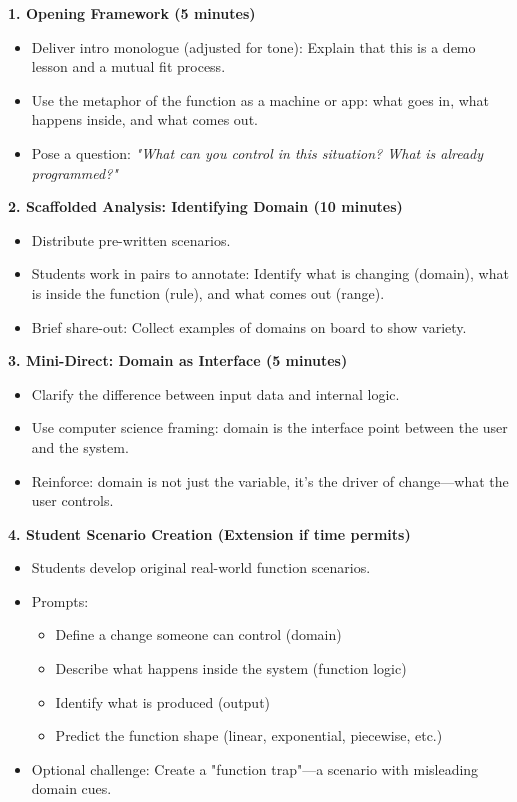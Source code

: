 \documentclass[12pt]{article}
\begin{document}
\textbf{1. Opening Framework (5 minutes)}
\begin{itemize}[nosep]
  \item Deliver intro monologue (adjusted for tone): Explain that this is a demo lesson and a mutual fit process.
  \item Use the metaphor of the function as a machine or app: what goes in, what happens inside, and what comes out.
  \item Pose a question: \textit{"What can you control in this situation? What is already programmed?"}
\end{itemize}

\textbf{2. Scaffolded Analysis: Identifying Domain (10 minutes)}
\begin{itemize}[nosep]
  \item Distribute pre-written scenarios.
  \item Students work in pairs to annotate: Identify what is changing (domain), what is inside the function (rule), and what comes out (range).
  \item Brief share-out: Collect examples of domains on board to show variety.
\end{itemize}

\textbf{3. Mini-Direct: Domain as Interface (5 minutes)}
\begin{itemize}[nosep]
  \item Clarify the difference between input data and internal logic.
  \item Use computer science framing: domain is the interface point between the user and the system.
  \item Reinforce: domain is not just the variable, it's the driver of change—what the user controls.
\end{itemize}

\textbf{4. Student Scenario Creation (Extension if time permits)}
\begin{itemize}[nosep]
  \item Students develop original real-world function scenarios.
  \item Prompts:
    \begin{itemize}[nosep]
      \item Define a change someone can control (domain)
      \item Describe what happens inside the system (function logic)
      \item Identify what is produced (output)
      \item Predict the function shape (linear, exponential, piecewise, etc.)
    \end{itemize}
  \item Optional challenge: Create a "function trap"—a scenario with misleading domain cues.
\end{itemize}
\end{document}

